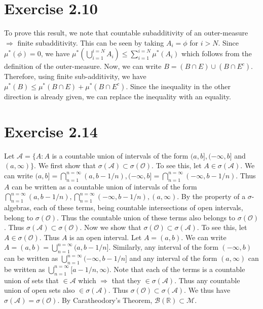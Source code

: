 \documentclass{article}
\begin{document}
  \section*{Exercise 2.10}
    To prove this result, we note that countable subadditivity of an outer-measure $\Rightarrow$ finite subadditivity. This can be seen by taking $A_i = \phi$ for $i > N$. Since $\mu^*(\phi)= 0$, we have
    $\mu^*(\bigcup_{i=1}^{i=N}A_i) \le \sum_{i=1}^{i=N}\mu^*(A_i)$ which follows from the definition of the outer-measure.
    \newline
    Now, we can write $B = (B \cap E) \cup (B \cap E^c)$. Therefore, using finite sub-additivity, we have $\mu^*(B) \le \mu^*(B \cap E) + \mu^*(B \cap E^c)$. Since the inequality in the other direction
    is already given, we can replace the inequality with an equality.

  \section*{Exercise 2.14}
    Let $\mathcal A = \{A: A$ is a countable union of intervals of the form $(a,b], (-\infty, b]$ and $(a, \infty)\}$. We first show that $\sigma(\mathcal A) \subset \sigma(\mathcal O)$. To see this,
    let $A \in \sigma(\mathcal A)$. We can write $(a,b] = \bigcap_{n=1}^{n=\infty}(a, b - 1/n), (- \infty, b] = \bigcap_{n=1}^{n=\infty}(-\infty, b- 1/n)$. Thus $A$ can be written as a countable union of
    intervals of the form $\bigcap_{n=1}^{n=\infty}(a, b-1/n), \bigcap_{n=1}^{n=\infty}(-\infty, b-1/n), (a, \infty)$. By the property of a $\sigma$- algebras, each of these terms, being countable intersections of
    open intervals, belong to $\sigma(\mathcal O)$. Thus the countable union of these terms also belongs to $\sigma(\mathcal O)$. Thus $\sigma(\mathcal A) \subset \sigma(\mathcal O)$.
    \newline
    Now we show that $\sigma(\mathcal O) \subset \sigma(\mathcal A)$. To see this, let $A \in \sigma(\mathcal O)$. Thus $A$ is an open interval. Let $A = (a,b)$. We can write $A = (a,b) = \bigcup_{n=1}^{n=\infty}(a, b-1/n]$. Similarly,
    any interval of the form $(-\infty, b)$ can be written as $\bigcup_{n=1}^{n=\infty}(-\infty, b-1/n]$ and any interval of the form $(a, \infty)$ can be written as $\bigcup_{n=1}^{n=\infty}[a-1/n, \infty)$.
    Note that each of the terms is a countable union of sets that $\in \mathcal A$ which $\Rightarrow$ that they $\in \sigma(\mathcal A)$. Thus any countable union of open sets also $\in \sigma(\mathcal A)$.
    Thus $\sigma(\mathcal O) \subset \sigma(\mathcal A)$.
    \newline
    We thus have $\sigma(\mathcal A) = \sigma(\mathcal O)$. By Caratheodory's Theorem, $\mathcal B(\mathbb R) \subset \mathcal M$.
\end{document}
